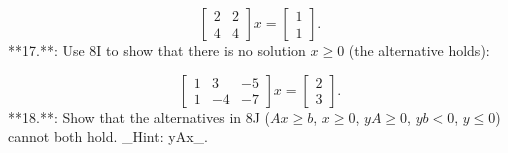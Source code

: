 \[\left[\begin{matrix}2&2\\ 4&4\end{matrix}\right]x=\left[\begin{matrix}1\\ 1\end{matrix}\right].\]
**17.**: Use 8I to show that there is no solution \(x\geq 0\) (the alternative holds):

\[\left[\begin{matrix}1&3&-5\\ 1&-4&-7\end{matrix}\right]x=\left[\begin{matrix}2\\ 3\end{matrix}\right].\]
**18.**: Show that the alternatives in 8J (\(Ax\geq b\), \(x\geq 0\), \(yA\geq 0\), \(yb<0\), \(y\leq 0\)) cannot both hold. _Hint: yAx_.

